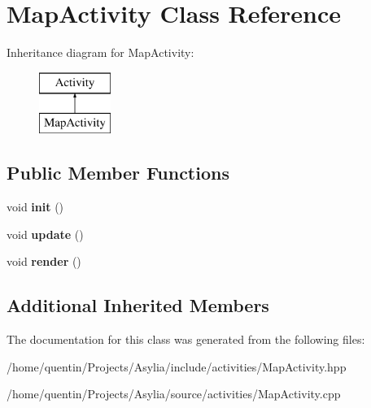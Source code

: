 \hypertarget{classMapActivity}{\section{Map\-Activity Class Reference}
\label{classMapActivity}
}
Inheritance diagram for Map\-Activity\-:\begin{figure}[H]
\begin{center}
\leavevmode
\includegraphics[height=2.000000cm]{classMapActivity}
\end{center}
\end{figure}
\subsection*{Public Member Functions}
\begin{DoxyCompactItemize}
\item 
\hypertarget{classMapActivity_a76aef9e9aefd80668becf9dc93345ba9}{void {\bfseries init} ()}\label{classMapActivity_a76aef9e9aefd80668becf9dc93345ba9}

\item 
\hypertarget{classMapActivity_aca3e8d6ee07c7e8a16cb64ae14d9e256}{void {\bfseries update} ()}\label{classMapActivity_aca3e8d6ee07c7e8a16cb64ae14d9e256}

\item 
\hypertarget{classMapActivity_a1b90f9cd60a8bf01047397fcc2b1a5c9}{void {\bfseries render} ()}\label{classMapActivity_a1b90f9cd60a8bf01047397fcc2b1a5c9}

\end{DoxyCompactItemize}
\subsection*{Additional Inherited Members}


The documentation for this class was generated from the following files\-:\begin{DoxyCompactItemize}
\item 
/home/quentin/\-Projects/\-Asylia/include/activities/Map\-Activity.\-hpp\item 
/home/quentin/\-Projects/\-Asylia/source/activities/Map\-Activity.\-cpp\end{DoxyCompactItemize}
